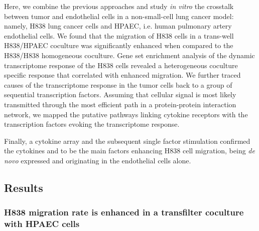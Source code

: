Here, we combine the previous approaches and
study \emph{in vitro} the crosstalk between tumor and 
endothelial cells in  a non-small-cell lung cancer model: namely,
H838 lung cancer cells and HPAEC, i.e. human pulmonary artery endothelial cells.
We found that the  migration of  H838 cells in a trans-well H838/HPAEC coculture
was significantly enhanced when compared to the H838/H838
homogeneous coculture.
Gene set enrichment analysis of the dynamic transcriptome
response of the H838 cells  revealed a heterogeneous 
coculture specific response 
that correlated with enhanced migration.
We further 
traced causes of the transcriptome response in the tumor cells back to 
a group of sequential transcription factors.
Assuming that cellular signal is most likely transmitted through the most efficient 
path in a protein-protein interaction network, we 
mapped the putative pathways linking cytokine receptors with the 
transcription factors evoking the transcriptome response. 

Finally, a cytokine array and the subsequent single factor 
stimulation
confirmed the cytokines \tnfa and \sdfonea
to be the main factors enhancing H838 cell migration,
being \emph{de novo} expressed and originating in the endothelial cells alone. 




\subsection{Results}

\subsubsection{H838 migration rate is enhanced in a transfilter coculture with HPAEC cells}

